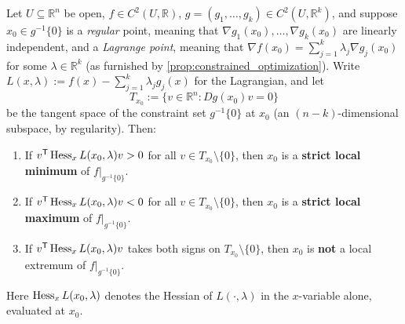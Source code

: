 \begin{theorem}
\label{thm:second_order_lagrange_test}
Let $U \subseteq \mathbb{R}^n$ be open, $f \in C^2(U,\mathbb{R})$, $g = (g_1,\dots,g_k) \in
C^2(U,\mathbb{R}^k)$, and suppose $x_0 \in g^{-1}\{0\}$ is a \emph{regular} point, meaning
that $\nabla g_1(x_0),\dots,\nabla g_k(x_0)$ are linearly independent, and a \emph{Lagrange
point}, meaning that $\nabla f(x_0) = \sum_{j=1}^k\lambda_j\nabla g_j(x_0)$ for some
$\lambda \in \mathbb{R}^k$ (as furnished by \cref{prop:constrained_optimization}).
Write $L(x,\lambda) := f(x) - \sum_{j=1}^k\lambda_jg_j(x)$ for the Lagrangian, and let
\[T_{x_0} := \{v \in \mathbb{R}^n : Dg(x_0)v = 0\}\]
be the tangent space of the constraint set $g^{-1}\{0\}$ at $x_0$ (an $(n-k)$-dimensional
subspace, by regularity). Then:
\begin{enumerate}[label=\textbf{(\alph*)}]
  \item If $v^{\mathsf{T}}\operatorname{Hess}_xL(x_0,\lambda)v > 0$ for all $v \in T_{x_0}\setminus\{0\}$, then
    $x_0$ is a \textbf{strict local minimum} of $f|_{g^{-1}\{0\}}$.
  \item If $v^{\mathsf{T}}\operatorname{Hess}_xL(x_0,\lambda)v < 0$ for all $v \in T_{x_0}\setminus\{0\}$, then
    $x_0$ is a \textbf{strict local maximum} of $f|_{g^{-1}\{0\}}$.
  \item If $v^{\mathsf{T}}\operatorname{Hess}_xL(x_0,\lambda)v$ takes both signs on $T_{x_0}\setminus\{0\}$, then
    $x_0$ is \textbf{not} a local extremum of $f|_{g^{-1}\{0\}}$.
\end{enumerate}
Here $\operatorname{Hess}_xL(x_0,\lambda)$ denotes the Hessian of $L(\cdot,\lambda)$ in the $x$-variable
alone, evaluated at $x_0$.
\end{theorem}

